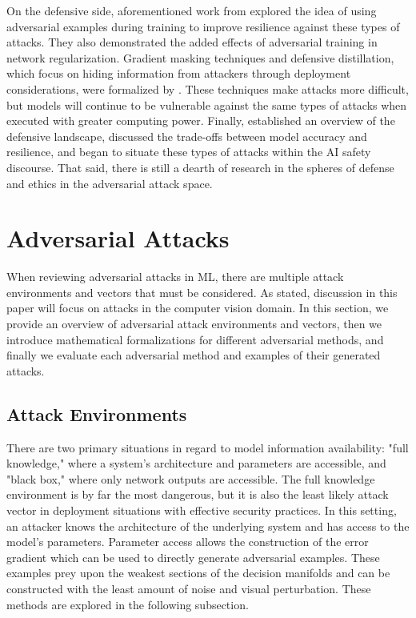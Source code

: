 \documentclass[]{article}
\begin{document}
On the defensive side, aforementioned work from \citet{DBLP:journals/corr/PapernotMGJCS16} explored the idea of using adversarial examples during training to improve resilience against these types of attacks. They also demonstrated the added effects of adversarial training in network regularization. Gradient masking techniques and defensive distillation, which focus on hiding information from attackers through deployment considerations, were formalized by \citet{DBLP:journals/corr/PapernotMWJS15}. These techniques make attacks more difficult, but models will continue to be vulnerable against the same types of attacks when executed with greater computing power. Finally, \citet{DBLP:journals/corr/PapernotMSW16} established an overview of the defensive landscape, discussed the trade-offs between model accuracy and resilience, and began to situate these types of attacks within the AI safety discourse. That said, there is still a dearth of research in the spheres of defense and ethics in the adversarial attack space.


\section{Adversarial Attacks}

When reviewing adversarial attacks in ML, there are multiple attack environments and vectors that must be considered. As stated, discussion in this paper will focus on attacks in the computer vision domain. In this section, we provide an overview of adversarial attack environments and vectors, then we introduce mathematical formalizations for different adversarial methods, and finally we evaluate each adversarial method and examples of their generated attacks.

\subsection{Attack Environments}

There are two primary situations in regard to model information availability: "full knowledge," where a system's architecture and parameters are accessible, and "black box," where only network outputs are accessible. The full knowledge environment is by far the most dangerous, but it is also the least likely attack vector in deployment situations with effective security practices. In this setting, an attacker knows the architecture of the underlying system and has access to the model's parameters. Parameter access allows the construction of the error gradient which can be used to directly generate adversarial examples. These examples prey upon the weakest sections of the decision manifolds and can be constructed with the least amount of noise and visual perturbation.
These methods are explored in the following subsection.
\end{document}
